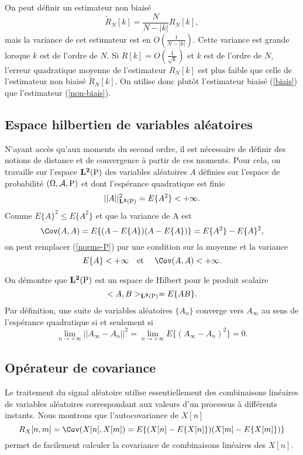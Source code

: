 On peut d\'efinir un estimateur non biais\'e 
\begin{equation}
\label{non-biais}
\tilde R_N [k] = \frac N {N-|k|} R_N [k] ,
\end{equation}
mais la variance de cet estimateur 
est en $O(\frac 1 {N-|k|})$. 
Cette variance est grande lorsque
$k$ est de l'ordre de $N$.
Si $R[k] = O(\frac 1 {\sqrt k})$ et $k$ est de l'ordre de $N$, 
l'erreur quadratique moyenne
de l'estimateur $ R_N [k]$ est plus faible que
celle de l'estimateur non biais\'e $\tilde R_N [k]$.
On utilise donc plut\^ot l'estimateur biais\'e (\ref{biais}) que
l'estimateur (\ref{non-biais}).

\subsection{Espace hilbertien de variables al\'eatoires}

N'ayant acc\`es qu'aux moments du second ordre, il est n\'ecessaire
de d\'efinir des notions de distance et
de convergence \`a partir de ces moments.
Pour cela, on travaille sur l'espace ${\bf L ^ 2 (\rm P)}$ 
des variables al\'eatoires $A$
d\'efinies sur l'espace de probabilit\'e 
$(\Omega , \cal A , \rm P)$ et
dont l'esp\'erance
quadratique est finie
\begin{equation}
\label{norme-P}
|| A ||_{{\bf L ^ 2 (\rm P)}} ^2 = E \{A^2\} < + \infty .
\end{equation}
Comme $E\{A\} ^2 \leq E \{A^2\}$ et que la variance de A est
\[
\Cov(A,A) = E\{(A - E\{A\})(A - E\{A\})\} = E\{A^2\} - E\{A\}^2, 
\]
on peut remplacer (\ref{norme-P})
par une condition sur la moyenne et la variance
\begin{equation}
\label{covar-cond}
E\{A\} < +\infty ~~~\mbox{et}~~~~
\Cov(A,A) < +\infty .
\end{equation}


On d\'emontre \cite{neveu}
que ${\bf L ^ 2 (\rm P)}$ est un espace de Hilbert pour
le produit scalaire
\begin{equation}
<A,B>_{\bf L ^ 2 (\rm P)} = E\{A B \} .
\end{equation}
Par d\'efinition, une suite de variables al\'eatoires 
$\{A_n\}$ converge vers $A_\infty$
au sens de l'esp\'erance quadratique si et seulement si
\[
\lim_{n \rightarrow + \infty} || A_\infty - A_n ||^2 = 
\lim_{n \rightarrow + \infty} E\{(A_\infty - A_n)^2\} = 0.
\]

\subsection{Op\'erateur de covariance}
Le traitement du signal al\'eatoire utilise 
essentiellement des combinaisons
lin\'eaires de variables al\'eatoires correspondant aux valeurs
d'un processus \`a diff\'erents instants.
Nous montrons que l'autocovariance de $X[n]$ 
\[
R_X[n,m]= \Cov (X[n],X[m]) = 
E\{(X[n] - E\{X[n]\})(X[m] - E\{X[m]\})\}
\]
permet de facilement calculer la covariance de combinaisons
lin\'eaires des $X[n]$.

